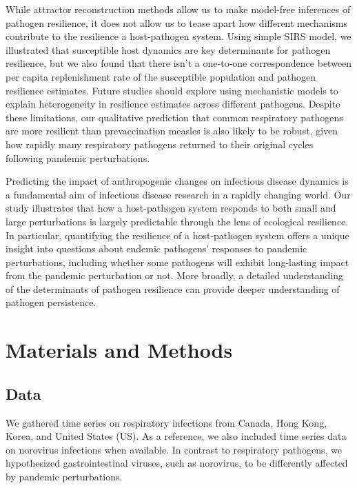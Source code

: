 \documentclass[12pt]{article}
\begin{document}
While attractor reconstruction methods allow us to make model-free inferences of pathogen resilience, it does not allow us to tease apart how different mechanisms contribute to the resilience a host-pathogen system.
Using simple SIRS model, we illustrated that susceptible host dynamics are key determinants for pathogen resilience, but we also found that there isn't a one-to-one correspondence between per capita replenishment rate of the susceptible population and pathogen resilience estimates.
Future studies should explore using mechanistic models to explain heterogeneity in resilience estimates across different pathogens.
Despite these limitations, our qualitative prediction that common respiratory pathogens are more resilient than prevaccination measles is also likely to be robust, given how rapidly many respiratory pathogens returned to their original cycles following pandemic perturbations.

Predicting the impact of anthropogenic changes on infectious disease dynamics is a fundamental aim of infectious disease research in a rapidly changing world.
Our study illustrates that how a host-pathogen system responds to both small and large perturbations is largely predictable through the lens of ecological resilience.
In particular, quantifying the resilience of a host-pathogen system offers a unique insight into questions about endemic pathogens' responses to pandemic perturbations, including whether some pathogens will exhibit long-lasting impact from the pandemic perturbation or not.
More broadly, a detailed understanding of the determinants of pathogen resilience can provide deeper understanding of pathogen persistence.

\section*{Materials and Methods}

\subsection*{Data}

We gathered time series on respiratory infections from Canada, Hong Kong, Korea, and United States (US).
As a reference, we also included time series data on norovirus infections when available.
In contrast to respiratory pathogens, we hypothesized gastrointestinal viruses, such as norovirus, to be differently affected by pandemic perturbations.
\end{document}
